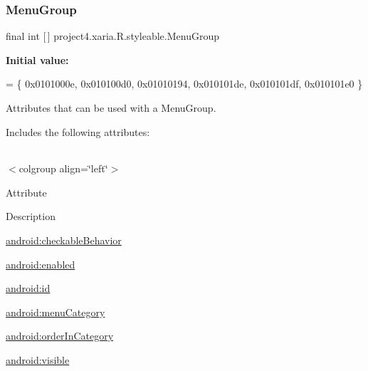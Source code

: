 \subsubsection{\texorpdfstring{Menu\+Group}{MenuGroup}}
{\footnotesize\ttfamily final int \mbox{[}$\,$\mbox{]} project4.\+xaria.\+R.\+styleable.\+Menu\+Group\hspace{0.3cm}{\ttfamily [static]}}

{\bfseries Initial value\+:}
\begin{DoxyCode}
= \{
            0x0101000e, 0x010100d0, 0x01010194, 0x010101de,
            0x010101df, 0x010101e0
        \}
\end{DoxyCode}
Attributes that can be used with a Menu\+Group. 

Includes the following attributes\+:

\tabulinesep=1mm
\begin{longtabu} spread 0pt [c]{*{0}{|X[-1]}|}
\hline
\end{longtabu}
$<$colgroup align=\char`\"{}left\char`\"{}$>$ 

Attribute

Description 

{\ttfamily \hyperlink{classproject4_1_1xaria_1_1R_1_1styleable_a42649ced9274b4efe7927b3f3b772144}{android\+:checkable\+Behavior}}

{\ttfamily \hyperlink{classproject4_1_1xaria_1_1R_1_1styleable_aab11de43b52f47075f886635de3205c7}{android\+:enabled}}

{\ttfamily \hyperlink{classproject4_1_1xaria_1_1R_1_1styleable_a640dfef25dc9726381405f90ea7a87a2}{android\+:id}}

{\ttfamily \hyperlink{classproject4_1_1xaria_1_1R_1_1styleable_aead14cbe860986024e8f6cbd4d09655a}{android\+:menu\+Category}}

{\ttfamily \hyperlink{classproject4_1_1xaria_1_1R_1_1styleable_a7352099be18dea8bbb19d98372d2b1ee}{android\+:order\+In\+Category}}

{\ttfamily \hyperlink{classproject4_1_1xaria_1_1R_1_1styleable_a8c41524dbd054ca8362714efbaa75719}{android\+:visible}}

